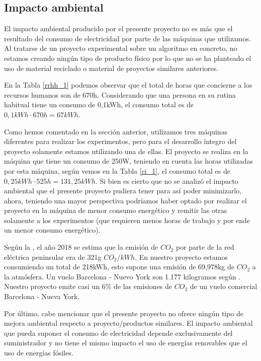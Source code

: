 \documentclass[titlepage,12pt]{report}
\begin{document}
\subsection{Impacto ambiental}

El impacto ambiental producido por el presente proyecto no es más que el resultado del consumo de electricidad por parte de las máquinas que utilizamos. Al tratarse de un proyecto experimental sobre un algoritmo en concreto, no estamos creando ningún tipo de producto físico por lo que no se ha planteado el uso de material reciclado o material de proyectos similares anteriores.

En la Tabla \ref{rrhh_1} podemos observar que el total de horas que concierne a los recursos humanos son de 670h. Considerando que una persona en su rutina habitual tiene un consumo de 0,1kWh, el consumo total es de $0,1kWh \cdot 670h = 67kWh$.

Como hemos comentado en la sección anterior, utilizamos tres máquinas diferentes para realizar los experimentos, pero para el desarrollo íntegro del proyecto solamente estamos utilizando una de ellas. El proyecto se realiza en la máquina que tiene un consumo de 250W, teniendo en cuenta las horas utilizadas por esta máquina, según vemos en la Tabla \ref{ci_1}, el consumo total es de $0,25kWh \cdot 525h = 131,25kWh$. Si bien es cierto que no se analizó el impacto ambiental que el presente proyecto pudiera tener para así poder minimizarlo, ahora, teniendo una mayor perspectiva podríamos haber optado por realizar el proyecto en la máquina de menor consumo energético y remitir las otras solamente a los experimentos (que requieren menos horas de trabajo y por ende un menor consumo energético).

Según la \citep{gene}, el año 2018 se estima que la emisión de $CO_{2}$ por parte de la red eléctrica peninsular era de 321g $CO_{2}/kWh$. En nuestro proyecto estamos consumiendo un total de 218kWh, esto supone una emisión de 69,978kg de $CO_{2}$ a la atmósfera. Un vuelo Barcelona -  Nuevo York son 1.177 kilogramos según \citep{hostel}. Nuestro proyecto emite casi un 6\% de las emisiones de $CO_{2}$ de un vuelo comercial Barcelona - Nueva York.

Por último, cabe mencionar que el presente proyecto no ofrece ningún tipo de mejora ambiental respecto a proyecto/productos similares. El impacto ambiental que pueda suponer el consumo de electricidad depende exclusivamente del suministrador y no tiene el mismo impacto el uso de energías renovables que el uso de energías fósiles.
\end{document}
